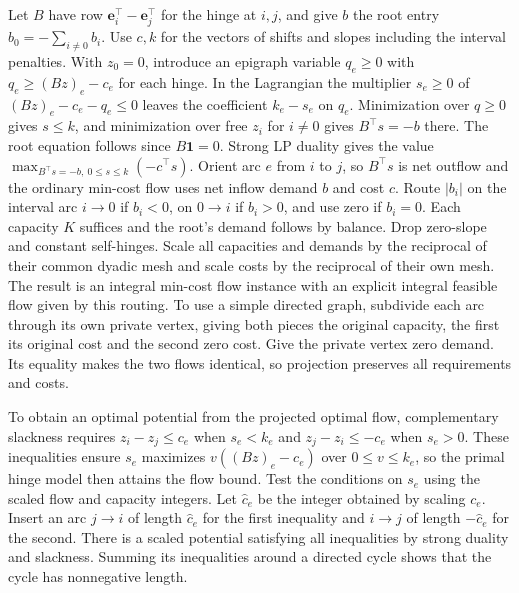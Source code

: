 \documentclass[11pt]{article}
\begin{document}
Let \(B\) have row \(\mathbf e_i^\top-\mathbf e_j^\top\) for the hinge at \(i,j\), and give \(b\) the root entry \(b_0=-\sum_{i\ne0} b_i\). Use \(c,k\) for the vectors of shifts and slopes including the interval penalties. With \(z_0=0\), introduce an epigraph variable \(q_e\ge0\) with \(q_e\ge (Bz)_e-c_e\) for each hinge. In the Lagrangian the multiplier \(s_e\ge0\) of \((Bz)_e-c_e-q_e\le0\) leaves the coefficient \(k_e-s_e\) on \(q_e\). Minimization over \(q\ge0\) gives \(s\le k\), and minimization over free \(z_i\) for \(i\ne0\) gives \(B^\top s=-b\) there. The root equation follows since \(B\mathbf1=0\). Strong LP duality gives the value \(\max_{B^\top s=-b,\ 0\le s\le k}(-c^\top s)\). Orient arc \(e\) from \(i\) to \(j\), so \(B^\top s\) is net outflow and the ordinary min-cost flow uses net inflow demand \(b\) and cost \(c\). Route \(|b_i|\) on the interval arc \(i\to0\) if \(b_i<0\), on \(0\to i\) if \(b_i>0\), and use zero if \(b_i=0\). Each capacity \(K\) suffices and the root's demand follows by balance. Drop zero-slope and constant self-hinges. Scale all capacities and demands by the reciprocal of their common dyadic mesh and scale costs by the reciprocal of their own mesh. The result is an integral min-cost flow instance with an explicit integral feasible flow given by this routing. To use a simple directed graph, subdivide each arc through its own private vertex, giving both pieces the original capacity, the first its original cost and the second zero cost. Give the private vertex zero demand. Its equality makes the two flows identical, so projection preserves all requirements and costs.

To obtain an optimal potential from the projected optimal flow, complementary slackness requires \(z_i-z_j\le c_e\) when \(s_e<k_e\) and \(z_j-z_i\le -c_e\) when \(s_e>0\). These inequalities ensure \(s_e\) maximizes \(v((Bz)_e-c_e)\) over \(0\le v\le k_e\), so the primal hinge model then attains the flow bound. Test the conditions on \(s_e\) using the scaled flow and capacity integers. Let \(\hat c_e\) be the integer obtained by scaling \(c_e\). Insert an arc \(j\to i\) of length \(\hat c_e\) for the first inequality and \(i\to j\) of length \(-\hat c_e\) for the second. There is a scaled potential satisfying all inequalities by strong duality and slackness. Summing its inequalities around a directed cycle shows that the cycle has nonnegative length.
\end{document}
